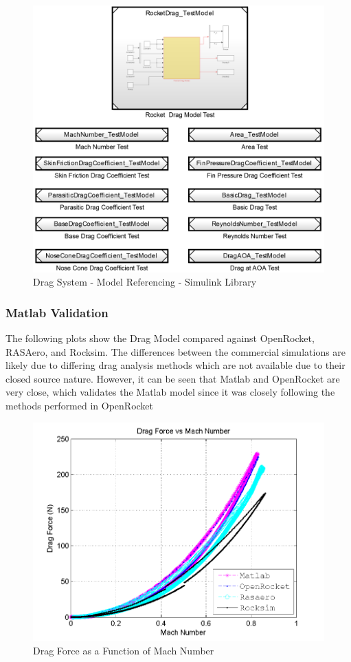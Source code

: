 \documentclass[]{article}
\begin{document}
\begin{figure}[htbp]
\centering
\includegraphics{images/DRAG_TESTING.png}
\caption{Drag System - Model Referencing - Simulink
Library\label{drag_model_reference_label}}
\end{figure}

\subsubsection{Matlab Validation}\label{matlab-validation}

The following plots show the Drag Model compared against OpenRocket,
RASAero, and Rocksim. The differences between the commercial simulations
are likely due to differing drag analysis methods which are not
available due to their closed source nature. However, it can be seen
that Matlab and OpenRocket are very close, which validates the Matlab
model since it was closely following the methods performed in OpenRocket

\begin{figure}[htbp]
\centering
\includegraphics{images/plots/error_dragforce_plot.png}
\caption{Drag Force as a Function of Mach Number
\label{error_dragforce_v_plot_label}}
\end{figure}
\end{document}
